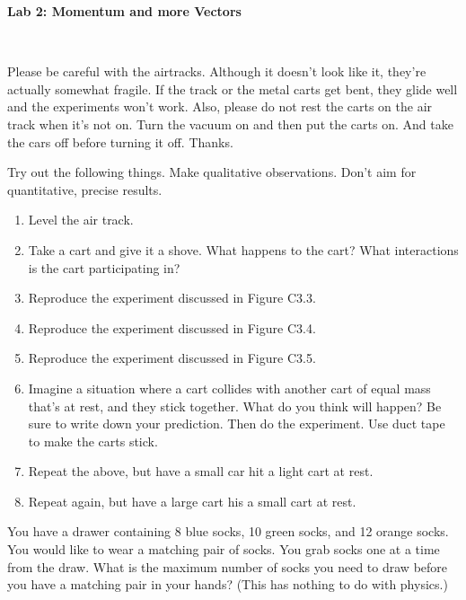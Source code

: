 \documentclass[12pt]{article}
\begin{document}
\pagestyle{empty}

\begin{center}
{\large {\bf Lab 2: Momentum and more Vectors}}\\
\end{center}

\hspace{2mm}\\


Please be careful with the airtracks.  Although it doesn't look like
it, they're actually somewhat fragile.  If the track or the metal
carts get bent, they glide well and the experiments won't work.  Also,
please do not rest the carts on the air track when it's not on.  Turn
the vacuum on and then put the carts on.  And take the cars off before
turning it off.  Thanks.

Try out the following things.  Make qualitative observations.  Don't
aim for quantitative, precise results. 

\begin{enumerate}
  \setlength{\itemsep}{-1mm}
    \item Level the air track.
    \item Take a cart and give it a shove. What happens to the cart?
    What interactions is the cart participating in? 
    \item Reproduce the experiment discussed in Figure C3.3.
    \item Reproduce the experiment discussed in Figure C3.4.
    \item Reproduce the experiment discussed in Figure C3.5.
    \item Imagine a situation where a cart collides with another cart
    of equal mass that's at rest, and they stick together. What do you
    think will happen? Be sure to write down your prediction. Then do the
    experiment. Use duct tape to make the carts stick.  
    \item Repeat the above, but have a small car hit a light cart at
    rest.
   \item Repeat again, but have a large cart his a small cart at
   rest. \\
\end{enumerate}



You have a drawer containing 8 blue socks, 10 green socks, and 12
orange socks.  You would like to wear a matching pair of socks.  You
grab socks one at a time from the draw.  What is the maximum number of
socks you need to draw before you have a matching pair in your hands?
(This has nothing to do with physics.) 
\end{document}
